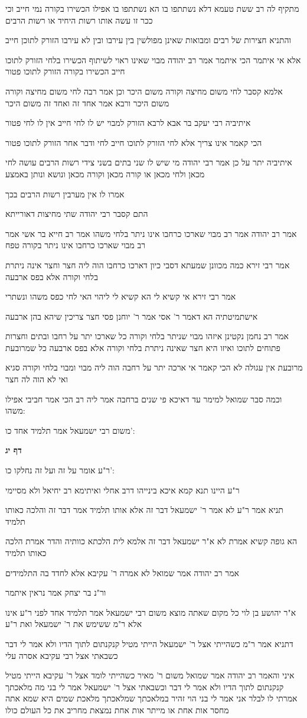\documentclass[12pt, openany]{book}
\newcommand{\sethebfont}{
\fontsize{10.5pt}{21.0pt} \selectfont
}
\newcommand{\textblock}[1]{
{\sethebfont #1\\}	
}
\newcommand{\sectname}{}
\newcommand{\newsection}[1]{
	\addcontentsline{toc}{section}{#1}
	\renewcommand{\sectname}{#1}	
	\vspace{-\baselineskip}
	\begin{center}
		\textbf{%
\fontsize{16pt}{16pt}\selectfont
			#1}
	\end{center}
	\vspace{-\baselineskip}
	\nopagebreak
}
\begin{document}
\textblock{מתקיף לה רב ששת טעמא דלא נשתתפו בו הא נשתתפו בו אפילו הכשירו בקורה נמי חייב וכי ככר זו עשה אותו רשות היחיד או רשות הרבים}
\textblock{והתניא חצירות של רבים ומבואות שאינן מפולשין בין עירבו ובין לא עירבו הזורק לתוכן חייב}
\textblock{אלא אי איתמר הכי איתמר אמר רב יהודה מבוי שאינו ראוי לשיתוף הכשירו בלחי הזורק לתוכו חייב הכשירו בקורה הזורק לתוכו פטור}
\textblock{אלמא קסבר לחי משום מחיצה וקורה משום היכר וכן אמר רבה לחי משום מחיצה וקורה משום היכר ורבא אמר אחד זה ואחד זה משום היכר}
\textblock{איתיביה רבי יעקב בר אבא לרבא הזורק למבוי יש לו לחי חייב אין לו לחי פטור}
\textblock{הכי קאמר אינו צריך אלא לחי הזורק לתוכו חייב לחי ודבר אחר הזורק לתוכו פטור}
\textblock{איתיביה יתר על כן אמר רבי יהודה מי שיש לו שני בתים בשני צידי רשות הרבים עושה לחי מכאן ולחי מכאן או קורה מכאן וקורה מכאן ונושא ונותן באמצע}
\textblock{אמרו לו אין מערבין רשות הרבים בכך}
\textblock{התם קסבר רבי יהודה שתי מחיצות דאורייתא}
\textblock{אמר רב יהודה אמר רב מבוי שארכו כרחבו אינו ניתר בלחי משהו אמר רב חייא בר אשי אמר רב מבוי שארכו כרחבו אינו ניתר בקורה טפח}
\textblock{אמר רבי זירא כמה מכוונן שמעתא דסבי כיון דארכו כרחבו הוה ליה חצר וחצר אינה ניתרת בלחי וקורה אלא בפס ארבעה}
\textblock{אמר רבי זירא אי קשיא לי הא קשיא לי ליהוי האי לחי כפס משהו ונשתרי}
\textblock{אישתמיטתיה הא דאמר ר' אסי אמר ר' יוחנן פסי חצר צריכין שיהא בהן ארבעה}
\textblock{אמר רב נחמן נקטינן איזהו מבוי שניתר בלחי וקורה כל שארכו יתר על רחבו ובתים וחצרות פתוחים לתוכו ואיזו היא חצר שאינה ניתרת בלחי וקורה אלא בפס ארבעה כל שמרובעת}
\textblock{מרובעת אין עגולה לא הכי קאמר אי ארכה יתר על רחבה הוה ליה מבוי ומבוי בלחי וקורה סגיא ואי לא הוה לה חצר}
\textblock{וכמה סבר שמואל למימר עד דאיכא פי שנים ברחבה אמר ליה רב הכי אמר חביבי אפילו משהו:}
\textblock{משום רבי ישמעאל אמר תלמיד אחד כו':}
\newsection{דף יג}
\textblock{ר"ע אומר על זה ועל זה נחלקו כו':}
\textblock{ר"ע היינו תנא קמא איכא בינייהו דרב אחלי ואיתימא רב יחיאל ולא מסיימי}
\textblock{תניא אמר ר"ע לא אמר ר' ישמעאל דבר זה אלא אותו תלמיד אמר דבר זה והלכה כאותו תלמיד}
\textblock{הא גופה קשיא אמרת לא א"ר ישמעאל דבר זה אלמא לית הלכתא כוותיה והדר אמרת הלכה כאותו תלמיד}
\textblock{אמר רב יהודה אמר שמואל לא אמרה ר' עקיבא אלא לחדד בה התלמידים}
\textblock{ור"נ בר יצחק אמר נראין איתמר}
\textblock{א"ר יהושע בן לוי כל מקום שאתה מוצא משום רבי ישמעאל אמר תלמיד אחד לפני ר"ע אינו אלא ר"מ ששימש את ר' ישמעאל ואת ר"ע}
\textblock{דתניא אמר ר"מ כשהייתי אצל ר' ישמעאל הייתי מטיל קנקנתום לתוך הדיו ולא אמר לי דבר כשבאתי אצל רבי עקיבא אסרה עלי}
\textblock{איני והאמר רב יהודה אמר שמואל משום ר' מאיר כשהייתי לומד אצל ר' עקיבא הייתי מטיל קנקנתום לתוך הדיו ולא אמר לי דבר וכשבאתי אצל ר' ישמעאל אמר לי בני מה מלאכתך אמרתי לו לבלר אני אמר לי בני הוי זהיר במלאכתך שמלאכתך מלאכת שמים היא שמא אתה מחסר אות אחת או מייתר אות אחת נמצאת מחריב את כל העולם כולו}
\end{document}
